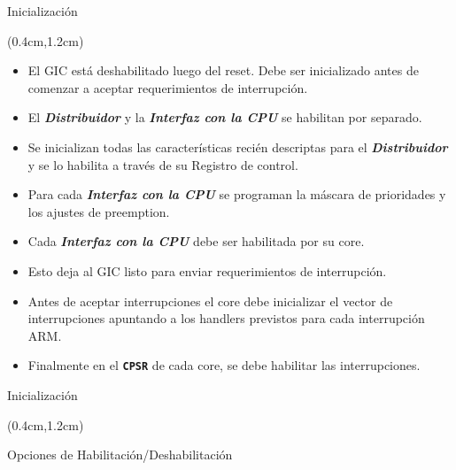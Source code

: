 \documentclass[usenames,table,xcolor={x11names},aspectratio=169]{beamer}
\begin{document}
\begin{frame}[t]{Inicialización}
 \begin{textblock*}{\textwidth}(0.4cm,1.2cm)
  \begin{itemize}[<+(1)->]\justifying%
   \item El GIC está deshabilitado luego del reset. Debe ser inicializado antes de comenzar a aceptar requerimientos de interrupción.
   \item El \textbf{\textit{Distribuidor}} y la \textbf{\textit{Interfaz con la CPU}} se habilitan por separado.
   \item Se inicializan todas las características recién descriptas para el \textbf{\textit{Distribuidor}} y se lo habilita a través de su Registro de control.
   \item Para cada \textbf{\textit{Interfaz con la CPU}} se programan la máscara de prioridades y los ajustes de preemption.
   \item Cada \textbf{\textit{Interfaz con la CPU}} debe ser habilitada por su core. 
   \item Esto deja al GIC listo para enviar requerimientos de interrupción.
   \item Antes de aceptar interrupciones el core debe inicializar el vector de interrupciones apuntando a los handlers previstos para cada interrupción ARM.
   \item Finalmente en el \textbf{\texttt{CPSR}} de cada core, se debe habilitar las interrupciones.
  \end{itemize}
 \end{textblock*}
\end{frame}

\begin{frame}[t]{Inicialización}
 \begin{textblock*}{\textwidth}(0.4cm,1.2cm)
  \begin{block}{Opciones de Habilitación/Deshabilitación}\justifying
   
   
  \end{block}
 \end{textblock*}
\end{frame}
\end{document}
